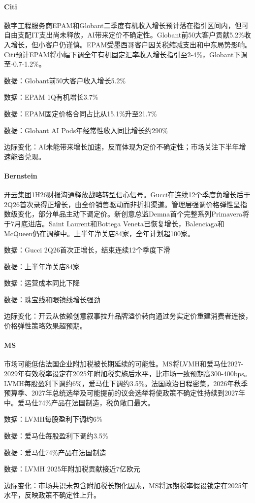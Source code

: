 \documentclass[11pt]{ctexart}
\begin{document}
\paragraph{Citi} 数字工程服务商EPAM和Globant二季度有机收入增长预计落在指引区间内，但可自由支配IT支出尚未释放，AI带来定价不确定性。Globant前50大客户贡献5.2\%收入增长，但小客户仍谨慎。EPAM受墨西哥客户因关税缩减支出和中东局势影响。Citi预计EPAM将小幅下调全年有机固定汇率收入增长指引至2-4\%，Globant下调至-0.7-1.2\%。
{\small\color{refgray}数据：Globant前50大客户收入增长5.2\%\par}
{\small\color{refgray}数据：EPAM 1Q有机增长3.7\%\par}
{\small\color{refgray}数据：EPAM固定价格合同占比从15.1\%升至21.7\%\par}
{\small\color{refgray}数据：Globant AI Pods年经常性收入同比增长约290\%\par}
{\small\color{refgray}边际变化：AI未能带来增长加速，反而体现为定价不确定性；市场关注下半年增速能否兑现。\par}
\paragraph{Bernstein} 开云集团1H26财报沟通释放战略转型信心信号。Gucci在连续12个季度负增长后于2Q26首次录得正增长，由全价销售驱动而非折扣渠道。管理层强调价格弹性呈指数级变化，部分单品主动下调定价。新创意总监Demna首个完整系列Primavera将于7月底进店。Saint Laurent和Bottega Veneta已恢复增长，Balenciaga和McQueen仍在调整中。上半年净关店84家，全年计划超100家。
{\small\color{refgray}数据：Gucci 2Q26首次正增长，结束连续12个季度下滑\par}
{\small\color{refgray}数据：上半年净关店84家\par}
{\small\color{refgray}数据：运营成本同比下降\par}
{\small\color{refgray}数据：珠宝线和眼镜线增长强劲\par}
{\small\color{refgray}边际变化：开云从依赖创意叙事拉升品牌溢价转向通过务实定价重建消费者连接，价格弹性策略效果超预期。\par}
\paragraph{MS} 市场可能低估法国企业附加税被长期延续的可能性。MS将LVMH和爱马仕2027-2029年有效税率设定在2025年附加税实施后水平，比市场一致预期高300-400bps。LVMH每股盈利下调约6\%，爱马仕下调约3.5\%。法国政治日程密集，2026年秋季预算季、2027年总统选举及可能提前的议会选举将使政策不确定性持续到2027年中。爱马仕74\%产品在法国制造，税负敞口最大。
{\small\color{refgray}数据：LVMH每股盈利下调约6\%\par}
{\small\color{refgray}数据：爱马仕每股盈利下调约3.5\%\par}
{\small\color{refgray}数据：爱马仕74\%产品在法国制造\par}
{\small\color{refgray}数据：LVMH 2025年附加税贡献接近7亿欧元\par}
{\small\color{refgray}边际变化：市场共识未包含附加税长期化因素，MS将远期税率假设锁定在2025年水平，反映政策不确定性上升。\par}
\end{document}
